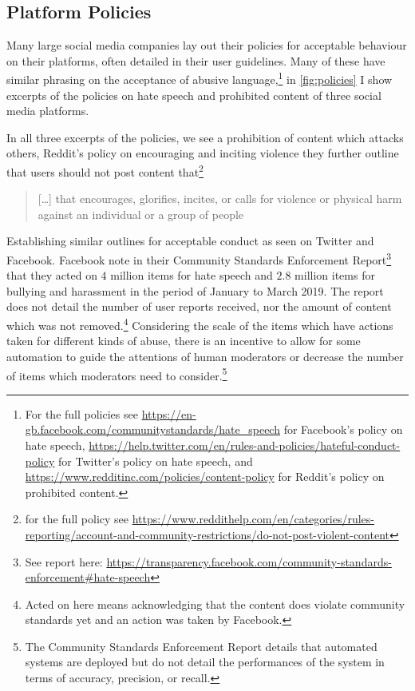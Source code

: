 \subsection{Platform Policies}

Many large social media companies lay out their policies for acceptable behaviour on their platforms, often detailed in their user guidelines. Many of these have similar phrasing on the acceptance of abusive language,\footnote{For the full policies see \url{https://en-gb.facebook.com/communitystandards/hate_speech} for Facebook's policy on hate speech, \url{https://help.twitter.com/en/rules-and-policies/hateful-conduct-policy} for Twitter's policy on hate speech, and \url{https://www.redditinc.com/policies/content-policy} for Reddit's policy on prohibited content.} in \autoref{fig:policies} I show excerpts of the policies on hate speech and prohibited content of three social media platforms.

In all three excerpts of the policies, we see a prohibition of content which attacks others, Reddit's policy on encouraging and inciting violence they further outline that users should not post content that\footnote{for the full policy see \url{https://www.reddithelp.com/en/categories/rules-reporting/account-and-community-restrictions/do-not-post-violent-content}}

\begin{quote}
  [\dots] that encourages, glorifies, incites, or calls for violence or physical harm against an individual or a group of people
\end{quote}

Establishing similar outlines for acceptable conduct as seen on Twitter and Facebook. Facebook note in their Community Standards Enforcement Report\footnote{See report here: \url{https://transparency.facebook.com/community-standards-enforcement\#hate-speech}} that they acted on $4$ million items for hate speech and $2.8$ million items for bullying and harassment in the period of January to March 2019. The report does not detail the number of user reports received, nor the amount of content which was not removed.\footnote{Acted on here means acknowledging that the content does violate community standards yet and an action was taken by Facebook.} Considering the scale of the items which have actions taken for different kinds of abuse, there is an incentive to allow for some automation to guide the attentions of human moderators or decrease the number of items which moderators need to consider.\footnote{The Community Standards Enforcement Report details that automated systems are deployed but do not detail the performances of the system in terms of accuracy, precision, or recall.}

